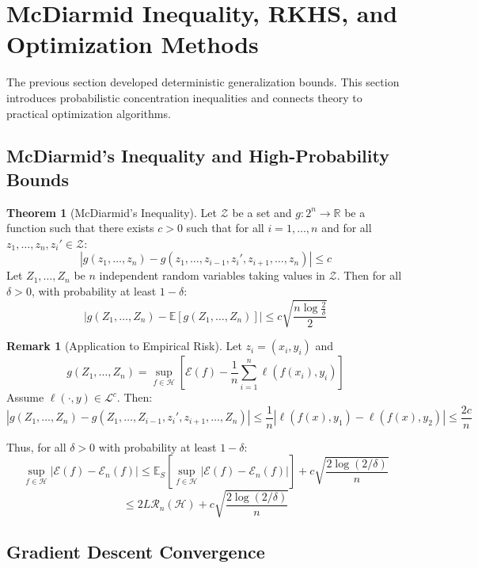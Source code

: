 \documentclass[12pt,a4paper]{article}
\theoremstyle{definition}
\newtheorem{theorem}{Theorem}[section]
\newtheorem{remark}{Remark}[section]
\begin{document}
\newpage


\section{McDiarmid Inequality, RKHS, and Optimization Methods}

The previous section developed deterministic generalization bounds. This section introduces probabilistic concentration inequalities and connects theory to practical optimization algorithms.

\subsection{McDiarmid's Inequality and High-Probability Bounds}

\begin{theorem}[McDiarmid's Inequality]
Let $\mathcal{Z}$ be a set and $g: 2^n \to \mathbb{R}$ be a function such that there exists $c > 0$ such that for all $i = 1, \ldots, n$ and for all $z_1, \ldots, z_n, z_i' \in \mathcal{Z}$:
\[
|g(z_1, \ldots, z_n) - g(z_1, \ldots, z_{i-1}, z_i', z_{i+1}, \ldots, z_n)| \leq c
\]
Let $Z_1, \ldots, Z_n$ be $n$ independent random variables taking values in $\mathcal{Z}$. Then for all $\delta > 0$, with probability at least $1 - \delta$:
\[
\left|g(Z_1, \ldots, Z_n) - \mathbb{E}[g(Z_1, \ldots, Z_n)]\right| \leq c\sqrt{\frac{n \log \frac{2}{\delta}}{2}}
\]
\end{theorem}

\begin{remark}[Application to Empirical Risk]
Let $z_i = (x_i, y_i)$ and 
\[
g(Z_1, \ldots, Z_n) = \sup_{f \in \mathcal{H}} \left[\mathcal{E}(f) - \frac{1}{n}\sum_{i=1}^n \ell(f(x_i), y_i)\right]
\]
Assume $\ell(\cdot, y) \in \mathcal{L}^c$. Then:
\[
\left|g(Z_1, \ldots, Z_n) - g(Z_1, \ldots, Z_{i-1}, z_i', z_{i+1}, \ldots, Z_n)\right| \leq \frac{1}{n}|\ell(f(x), y_1) - \ell(f(x), y_2)| \leq \frac{2c}{n}
\]

Thus, for all $\delta > 0$ with probability at least $1 - \delta$:
\[
\sup_{f \in \mathcal{H}} |\mathcal{E}(f) - \mathcal{E}_n(f)| \leq \mathbb{E}_S\left[\sup_{f \in \mathcal{H}}|\mathcal{E}(f) - \mathcal{E}_n(f)|\right] + c\sqrt{\frac{2\log(2/\delta)}{n}}
\]
\[
\leq 2L\mathcal{R}_n(\mathcal{H}) + c\sqrt{\frac{2\log(2/\delta)}{n}}
\]
\end{remark}

\subsection{Gradient Descent Convergence}
\end{document}
